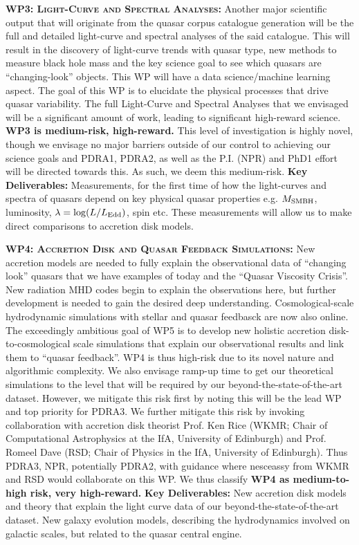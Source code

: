 \documentclass[oneside, a4paper, onecolumn, 11pt]{article}
\begin{document}
\smallskip
\smallskip
\noindent
\textbf{\textsc{WP3: Light-Curve and Spectral Analyses:}} 
Another major scientific output that will originate from the quasar
corpus catalogue generation will be the full and detailed light-curve
and spectral analyses of the said catalogue. This will result in the
discovery of light-curve trends with quasar type, new methods to
measure black hole mass and the key science goal to see which quasars
are ``changing-look'' objects. This WP will have a data
science/machine learning aspect.  The goal of this WP is to elucidate
the physical processes that drive quasar variability.  The full
Light-Curve and Spectral Analyses that we envisaged will be a
significant amount of work, leading to significant high-reward
science.  
%
{\bf WP3 is medium-risk, high-reward.}  
%
This level of investigation is highly novel, though we envisage no
major barriers outside of our control to achieving our science goals
and PDRA1, PDRA2, as well as the P.I. (NPR) and PhD1 effort will be
directed towards this.
%
As such, we deem this medium-risk.  {\bf Key
Deliverables:} Measurements, for the first time of how the
light-curves and spectra of quasars depend on key physical quasar
properties e.g. $M_{\rm SMBH}$, luminosity, $\lambda = \log (L /
L_{\rm Edd})$, spin etc.  These measurements will allow us to make
direct comparisons to accretion disk models.


\smallskip
\smallskip
\noindent
\textbf{\textsc{WP4: Accretion Disk and Quasar Feedback Simulations:}} 
New accretion models are needed to fully explain the observational
data of ``changing look'' quasars that we have examples of today 
and the ``Quasar Viscosity Crisis''. New radiation MHD codes begin to explain the
observations here, but further development is needed to gain the
desired deep understanding. 
Cosmological-scale hydrodynamic simulations with stellar and quasar feedbasck 
are now also online. 
The exceedingly ambitious goal of WP5 is to develop new holistic accretion disk-to-cosmological scale 
simulations that explain our observational results and link them to ``quasar feedback''. 
WP4 is thus high-risk due to its novel nature and algorithmic complexity. 
We also envisage ramp-up time to get our theoretical simulations to the level that will be required by 
our beyond-the-state-of-the-art dataset. 
%
However, we mitigate this risk first by noting  
this will be the lead WP and top priority for 
PDRA3. 
We further mitigate this risk by invoking collaboration with accretion disk theorist
Prof. Ken Rice (WKMR; Chair of Computational
Astrophysics at the IfA, University of Edinburgh) and 
Prof. Romeel Dave (RSD; Chair of Physics in the IfA, University of Edinburgh). 
%
Thus  PDRA3, NPR, potentially PDRA2, with guidance where nesceassy from WKMR and RSD 
would collaborate on this WP. 
We thus classify {\bf WP4 as medium-to-high risk, very high-reward.} 
{\bf Key Deliverables:} New accretion disk models and theory that explain the 
light curve data of our beyond-the-state-of-the-art dataset. 
 New galaxy evolution models, describing the hydrodynamics 
involved on galactic scales, but related to the quasar central engine. 
\end{document}
